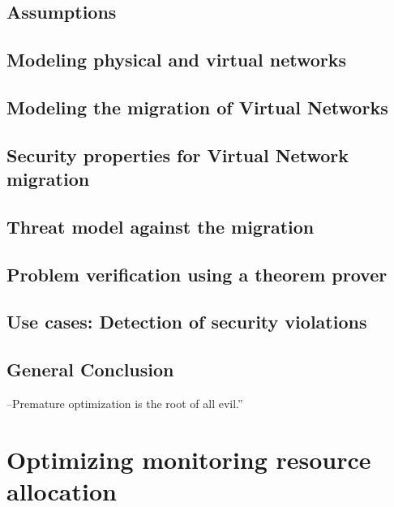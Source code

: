 \documentclass[a4paper, 11pt]{report}
\theoremstyle{definition}
\begin{document}
\section{Assumptions}


\newpage
\section{Modeling physical and virtual networks}


\newpage
\section{Modeling the migration of Virtual Networks}


\newpage
\section{Security properties for Virtual Network migration}




\section{Threat model against the migration}


\section{Problem verification using a theorem prover}


\section{Use cases: Detection of security violations}


\newpage
\section{General Conclusion}


\newpage
\begin{savequote}
--Premature optimization is the root of all evil.”
\end{savequote}
\chapter{Optimizing monitoring resource allocation}
\label{sec:RAprob}

\end{document}
